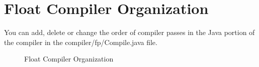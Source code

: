 \section{Float Compiler Organization}

You can add, delete or change the order of compiler passes in the Java portion of the compiler in the compiler/fp/Compile.java file.

\begin{figure}[ht]
\caption{\label{org-diag} Float Compiler Organization}
\vspace{-.25in}
\end{figure}
